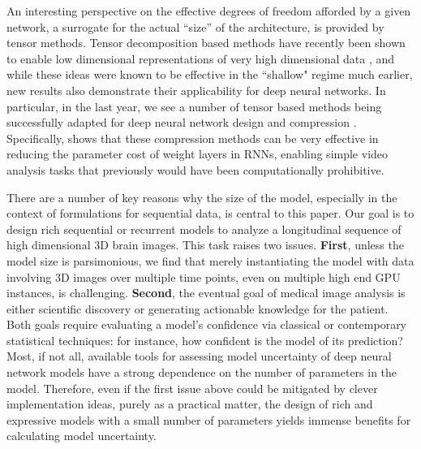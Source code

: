 An interesting perspective on the effective degrees of freedom afforded 
by a given network, a surrogate for the actual ``size'' of the architecture, 
is provided by tensor methods.
Tensor decomposition based methods have recently been shown to enable low dimensional representations of very high dimensional data \citep{hwangCvpr18}, 
and while these ideas were known to be effective in the ``shallow" regime much earlier, new results also demonstrate their applicability for deep neural 
networks. 
In particular, in the last year, we see a number of tensor based methods being successfully adapted for deep neural network design and compression \citep{cohen2016expressive,zhang2017tucker,yu2017compressing,xiong2019antnets}.
Specifically, \cite{pmlr-v70-yang17e} shows that these compression methods can be very effective in reducing the parameter cost of weight layers in RNNs, enabling simple video analysis tasks that previously would have been computationally prohibitive.

There are a number of key reasons why the size of the model, especially in the context of formulations for sequential data, is central to this paper. Our goal is to design rich sequential or recurrent models to analyze a longitudinal sequence of high dimensional 3D brain images. 
This task raises two issues. \textbf{First}, 
unless the model size is parsimonious, we find that merely instantiating the 
model with data involving 3D images over multiple time points, even on multiple high end GPU instances, is challenging.
\textbf{Second}, 
the eventual goal of medical image analysis is either scientific discovery or generating 
actionable knowledge for the patient. 
Both goals require evaluating a model's confidence via 
classical or contemporary statistical techniques: for instance, how confident is the model of its prediction?  
Most, if not all, available tools for assessing 
model uncertainty of deep neural network models 
have a strong dependence on the number of parameters in 
the model. Therefore, even if the first issue above could be mitigated by clever implementation ideas, purely as a practical 
matter, the design of rich and expressive models with a small number of parameters yields immense benefits for calculating model uncertainty.


